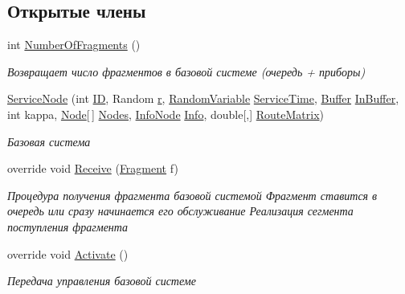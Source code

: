 \subsection*{Открытые члены}
\begin{DoxyCompactItemize}
\item 
int \hyperlink{class_network_simulator_1_1_service_node_a342272f5141858d2c957ad2bef849184}{Number\+Of\+Fragments} ()
\begin{DoxyCompactList}\small\item\em Возвращает число фрагментов в базовой системе (очередь + приборы) \end{DoxyCompactList}\item 
\hyperlink{class_network_simulator_1_1_service_node_af11f8ab97cd12922521ee35f47b8508c}{Service\+Node} (int \hyperlink{class_network_simulator_1_1_node_a1ba068212f50babe026c527a9b5fb55a}{ID}, Random \hyperlink{class_network_simulator_1_1_node_a3eb74310ed895ee8ec49c1850c1c405e}{r}, \hyperlink{class_random_variables_1_1_random_variable}{Random\+Variable} \hyperlink{class_network_simulator_1_1_service_node_ad8db6aa20ec8e8ab9f53268c3a90b05d}{Service\+Time}, \hyperlink{class_network_simulator_1_1_buffer}{Buffer} \hyperlink{class_network_simulator_1_1_service_node_ae4baae1147ffac6e43ab3c5917849473}{In\+Buffer}, int kappa, \hyperlink{class_network_simulator_1_1_node}{Node}\mbox{[}$\,$\mbox{]} \hyperlink{class_network_simulator_1_1_node_abae5930cce02aa93551aefe417b23fa0}{Nodes}, \hyperlink{class_network_simulator_1_1_info_node}{Info\+Node} \hyperlink{class_network_simulator_1_1_node_a63e706d7158c6ea84ea8fdbe61d9bffb}{Info}, double\mbox{[},\mbox{]} \hyperlink{class_network_simulator_1_1_service_node_a2e789a68c35295daa0c66b1cccf40247}{Route\+Matrix})
\begin{DoxyCompactList}\small\item\em Базовая система \end{DoxyCompactList}\item 
override void \hyperlink{class_network_simulator_1_1_service_node_a5d2b640ef13859e73a262714701d7dd7}{Receive} (\hyperlink{class_network_simulator_1_1_fragment}{Fragment} f)
\begin{DoxyCompactList}\small\item\em Процедура получения фрагмента базовой системой Фрагмент ставится в очередь или сразу начинается его обслуживание Реализация сегмента поступления фрагмента \end{DoxyCompactList}\item 
override void \hyperlink{class_network_simulator_1_1_service_node_af79c8221f7989b2dcb7aa4423ca437c3}{Activate} ()
\begin{DoxyCompactList}\small\item\em Передача управления базовой системе \end{DoxyCompactList}\end{DoxyCompactItemize}
